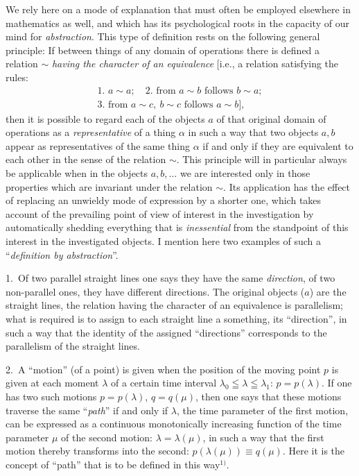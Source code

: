 \documentclass{article}
\begin{document}
We rely here on a mode of explanation that must often be employed elsewhere in mathematics as well, and which has its psychological roots in the capacity of our mind for \emph{abstraction}. This type of definition rests on the following general principle: If between things of any domain of operations there is defined a relation $\sim$ \emph{having the character of an equivalence} [i.e., a relation satisfying the rules:
\[ \begin{gathered} \text{1.\ } a \sim a; \quad \text{2.\ from } a \sim b \text{ follows } b \sim a; \\ \text{3.\ from } a \sim c, \ b \sim c \text{ follows } a \sim b], \end{gathered} \]
then it is possible to regard each of the objects $a$ of that original domain of operations as a \emph{representative} of a thing $\alpha$ in such a way that two objects $a, b$ appear as representatives of the same thing $\alpha$ if and only if they are equivalent to each other in the sense of the relation $\sim$. This principle will in particular always be applicable when in the objects $a, b, \dots$ we are interested only in those properties which are invariant under the relation $\sim$. Its application has the effect of replacing an unwieldy mode of expression by a shorter one, which takes account of the prevailing point of view of interest in the investigation by automatically shedding everything that is \emph{inessential} from the standpoint of this interest in the investigated objects. I mention here two examples of such a ``\emph{definition by abstraction}''.

1.\ Of two parallel straight lines one says they have the same \emph{direction}, of two non-parallel ones, they have different directions. The original objects ($a$) are the straight lines, the relation having the character of an equivalence is parallelism; what is required is to assign to each straight line a something, its ``direction'', in such a way that the identity of the assigned ``directions'' corresponds to the parallelism of the straight lines.

2.\ A ``motion'' (of a point) is given when the position of the moving point $p$ is given at each moment $\lambda$ of a certain time interval $\lambda_0 \leqq \lambda \leqq \lambda_1$: $p = p(\lambda)$. If one has two such motions $p = p(\lambda)$, $q = q(\mu)$, then one says that these motions traverse the same ``\emph{path}'' if and only if $\lambda$, the time parameter of the first motion, can be expressed as a continuous monotonically increasing function of the time parameter $\mu$ of the second motion: $\lambda = \lambda(\mu)$, in such a way that the first motion thereby transforms into the second: $p(\lambda(\mu)) \equiv q(\mu)$. Here it is the concept of ``path'' that is to be defined in this way${}^{1)}$.
\end{document}
